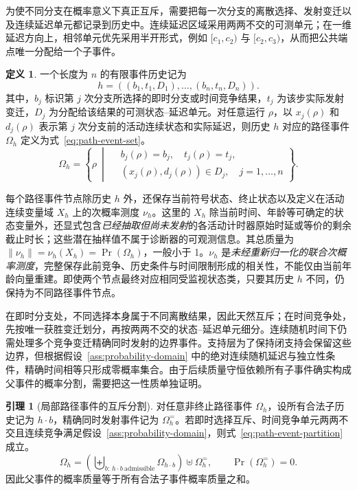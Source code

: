 \documentclass[master,fontset=ubuntu]{shnuthesis}
\theoremstyle{definition}
\newtheorem{thesisdefinition}{定义}
\newtheorem{thesislemma}{引理}
\begin{document}
为使不同分支在概率意义下真正互斥，需要把每一次分支的离散选择、发射变迁以及连续延迟单元都记录到历史中。连续延迟区域采用两两不交的可测单元；在一维延迟方向上，相邻单元优先采用半开形式，例如 \([c_1,c_2)\) 与 \([c_2,c_3)\)，从而把公共端点唯一分配给一个子事件。

\begin{thesisdefinition}
\label{def:path-event}
一个长度为 \(n\) 的有限事件历史记为
\begin{equation}
h=((b_1,t_1,D_1),\ldots,(b_n,t_n,D_n)).
\label{eq:path-event-history}
\end{equation}
其中，\(b_j\) 标识第 \(j\) 次分支所选择的即时分支或时间竞争结果，\(t_j\) 为该步实际发射变迁，\(D_j\) 为分配给该结果的可测状态--延迟单元。对任意运行 \(\rho\)，以 \(x_j(\rho)\) 和 \(d_j(\rho)\) 表示第 \(j\) 次分支前的活动连续状态和实际延迟，则历史 \(h\) 对应的路径事件 \(\Omega_h\) 定义为式~\eqref{eq:path-event-set}。
\begin{equation}
\Omega_h
=
\left\{
\rho\ \middle|\
\begin{aligned}
&b_j(\rho)=b_j,\quad t_j(\rho)=t_j,\\
&(x_j(\rho),d_j(\rho))\in D_j,\quad
j=1,\ldots,n
\end{aligned}
\right\}.
\label{eq:path-event-set}
\end{equation}
\end{thesisdefinition}

每个路径事件节点除历史 \(h\) 外，还保存当前符号状态、终止状态以及定义在活动连续变量域 \(X_h\) 上的次概率测度 \(\nu_h\)。这里的 \(X_h\) 除当前时间、年龄等可确定的状态变量外，还显式包含\emph{已经抽取但尚未发射}的各活动计时器原始时延或等价的剩余截止时长；这些潜在抽样值不属于诊断器的可观测信息。其总质量为 \(\|\nu_h\|=\nu_h(X_h)=\Pr(\Omega_h)\)，一般小于 1。\(\nu_h\) 是\emph{未经重新归一化的联合次概率测度}，完整保存此前竞争、历史条件与时间限制形成的相关性，不能仅由当前年龄向量重建。即使两个节点最终对应相同受监视状态类，只要其历史 \(h\) 不同，仍保持为不同路径事件节点。

在即时分支处，不同选择本身属于不同离散结果，因此天然互斥；在时间竞争处，先按唯一获胜变迁划分，再按两两不交的状态--延迟单元细分。连续随机时间下仍需处理多个竞争变迁精确同时发射的边界事件。支持层为了保持闭支持会保留这些边界，但根据假设~\ref{ass:probability-domain} 中的绝对连续随机延迟与独立性条件，精确时间相等只形成零概率集合。由于后续质量守恒依赖所有子事件确实构成父事件的概率分割，需要把这一性质单独证明。

\begin{thesislemma}[局部路径事件的互斥分割]
\label{lem:path-event-partition}
对任意非终止路径事件 \(\Omega_h\)，设所有合法子历史记为 \(h\!\cdot\!b\)，精确同时发射事件记为 \(\Omega_h^{=}\)。若即时选择互斥、时间竞争单元两两不交且连续竞争满足假设~\ref{ass:probability-domain}，则式~\eqref{eq:path-event-partition} 成立。
\begin{equation}
\Omega_h
=
\left(
\biguplus_{b:\,h\cdot b\ \mathrm{admissible}}
\Omega_{h\cdot b}
\right)
\uplus
\Omega_h^{=},
\qquad
\Pr(\Omega_h^{=})=0.
\label{eq:path-event-partition}
\end{equation}
因此父事件的概率质量等于所有合法子事件概率质量之和。
\end{thesislemma}
\end{document}
